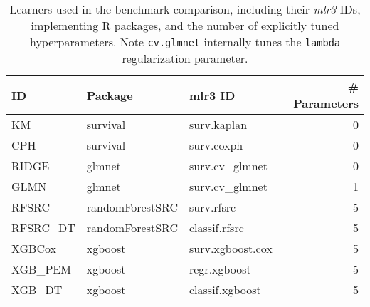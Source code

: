 \begin{table}

\caption{Learners used in the benchmark comparison, including their \textit{mlr3} IDs, implementing R packages, and the number of explicitly tuned hyperparameters. Note \texttt{cv.glmnet} internally tunes the \texttt{lambda} regularization parameter.\label{tab:bm-learners}}
\centering
\begin{tabular}[t]{lllr}
\toprule
ID & Package & mlr3 ID & \# Parameters\\
\midrule
KM & survival & surv.kaplan & 0\\
CPH & survival & surv.coxph & 0\\
RIDGE & glmnet & surv.cv\_glmnet & 0\\
GLMN & glmnet & surv.cv\_glmnet & 1\\
RFSRC & randomForestSRC & surv.rfsrc & 5\\
RFSRC\_DT & randomForestSRC & classif.rfsrc & 5\\
XGBCox & xgboost & surv.xgboost.cox & 5\\
XGB\_PEM & xgboost & regr.xgboost & 5\\
XGB\_DT & xgboost & classif.xgboost & 5\\
\bottomrule
\end{tabular}
\end{table}
